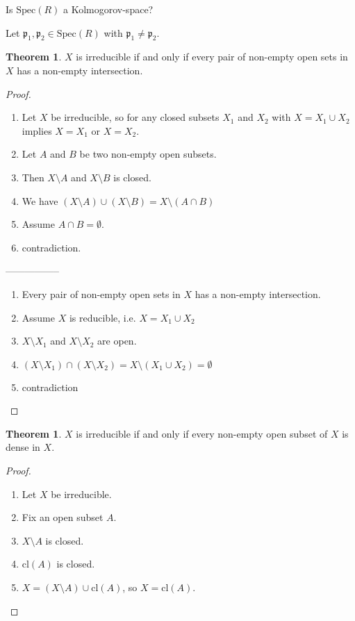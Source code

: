 \documentclass[a4paper]{book}
\theoremstyle{definition}
\newtheorem{theorem}[definition]{Theorem}
\begin{document}
Is \(\text{Spec}(R)\) a Kolmogorov-space?

Let \(\mathfrak{p}_1, \mathfrak{p}_2 \in \text{Spec}(R)\) with \(\mathfrak{p}_1 \neq \mathfrak{p}_2\).


\begin{theorem}
    \(X\) is irreducible if and only if every pair of non-empty open sets in \(X\) has a non-empty intersection.
\end{theorem}
\begin{proof}
    \begin{enumerate}
        \item Let \(X\) be irreducible, so for any closed subsets \(X_1\) and \(X_2\) with \(X =  X_1 \cup X_2\) implies \(X = X_1\) or \(X = X_2\).
        \item Let \(A\) and \(B\) be two non-empty open subsets.
        \item Then \(X \setminus A\) and \(X \setminus B\) is closed.
        \item We have \((X \setminus A) \cup (X \setminus B) = X \setminus (A \cap B)\)
        \item Assume \(A \cap B = \emptyset\).
        \item contradiction.
    \end{enumerate}
-----------------
    \begin{enumerate}
        \item Every pair of non-empty open sets in \(X\) has a non-empty intersection.
        \item Assume \(X\) is reducible, i.e. \(X = X_1 \cup X_2\)
        \item \(X \setminus X_1\) and \(X \setminus X_2\) are open.
        \item \((X \setminus X_1) \cap (X \setminus X_2) = X \setminus (X_1 \cup X_2) = \emptyset\)
        \item contradiction
    \end{enumerate}
\end{proof}

\begin{theorem}
    \(X\) is irreducible if and only if every non-empty open subset of \(X\) is dense in \(X\).
\end{theorem}
\begin{proof}
    \begin{enumerate}
        \item Let \(X\) be irreducible.
        \item Fix an open subset \(A\).
        \item \(X \setminus A\) is closed.
        \item \(\text{cl}(A)\) is closed.
        \item \(X = (X \setminus A) \cup \text{cl}(A)\), so \(X = \text{cl}(A)\).
    \end{enumerate}
\end{proof}
\end{document}

